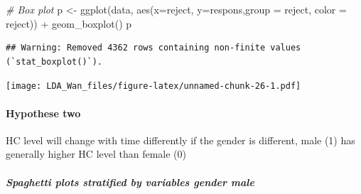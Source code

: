 \documentclass[
]{article}
\newenvironment{Shaded}{\begin{snugshade}}{\end{snugshade}}
\newcommand{\AttributeTok}[1]{\textcolor[rgb]{0.77,0.63,0.00}{#1}}
\newcommand{\CommentTok}[1]{\textcolor[rgb]{0.56,0.35,0.01}{\textit{#1}}}
\newcommand{\FunctionTok}[1]{\textcolor[rgb]{0.00,0.00,0.00}{#1}}
\newcommand{\NormalTok}[1]{#1}
\newcommand{\OtherTok}[1]{\textcolor[rgb]{0.56,0.35,0.01}{#1}}
\newcommand{\SpecialCharTok}[1]{\textcolor[rgb]{0.00,0.00,0.00}{#1}}
\newcommand{\StringTok}[1]{\textcolor[rgb]{0.31,0.60,0.02}{#1}}
\begin{document}
\begin{Shaded}
\begin{Highlighting}[]
\CommentTok{\# Box plot}
\NormalTok{p }\OtherTok{\textless{}{-}} \FunctionTok{ggplot}\NormalTok{(data, }\FunctionTok{aes}\NormalTok{(}\AttributeTok{x=}\NormalTok{reject, }\AttributeTok{y=}\NormalTok{respons,}\AttributeTok{group =}\NormalTok{ reject, }\AttributeTok{color =}\NormalTok{ reject)) }\SpecialCharTok{+}  
  \FunctionTok{geom\_boxplot}\NormalTok{()}
\NormalTok{p}
\end{Highlighting}
\end{Shaded}

\begin{verbatim}
## Warning: Removed 4362 rows containing non-finite values (`stat_boxplot()`).
\end{verbatim}

\texttt{[image: LDA\_Wan\_files/figure-latex/unnamed-chunk-26-1.pdf]}

\hypertarget{hypothese-two}{%
\paragraph{Hypothese two}\label{hypothese-two}}

HC level will change with time differently if the gender is different,
male (1) has generally higher HC level than female (0)

\begin{Shaded}
\end{Shaded}

\hypertarget{spaghetti-plots-stratified-by-variables-gender-male}{%
\subparagraph{Spaghetti plots stratified by variables gender
male}\label{spaghetti-plots-stratified-by-variables-gender-male}}
\end{document}
